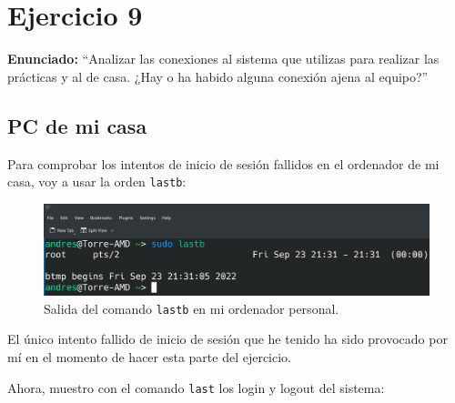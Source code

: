 \documentclass{article}
\begin{document}
\section{Ejercicio 9}

\textbf{Enunciado: }``Analizar las conexiones al sistema que utilizas para realizar las prácticas y al de casa. ¿Hay o ha habido alguna conexión ajena al equipo?''

\subsection{PC de mi casa}
Para comprobar los intentos de inicio de sesión fallidos en el ordenador de mi casa, voy a usar la orden \verb|lastb|:

\begin{figure}[H]
    \includegraphics[width=\textwidth]{imagenes/lastbcasa.png}
    \caption{Salida del comando \texttt{lastb} en mi ordenador personal.}
\end{figure}

El único intento fallido de inicio de sesión que he tenido ha sido provocado por mí en el momento de hacer esta parte del ejercicio.

\newpage

Ahora, muestro con el comando \verb|last| los login y logout del sistema:
\end{document}

